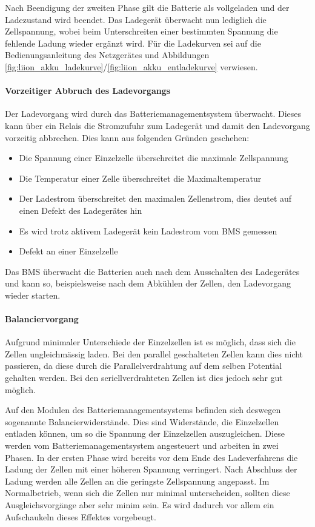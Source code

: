 Nach Beendigung der zweiten Phase gilt die Batterie als vollgeladen und der Ladezustand wird beendet. Das Ladegerät überwacht nun lediglich die Zellspannung, wobei beim Unterschreiten einer bestimmten Spannung die fehlende Ladung wieder ergänzt wird. Für die Ladekurven sei auf die Bedienungsanleitung des Netzgerätes \cite{ladegeraet} und Abbildungen \ref{fig:liion_akku_ladekurve}/\ref{fig:liion_akku_entladekurve} verwiesen.

\paragraph{Vorzeitiger Abbruch des Ladevorgangs}
Der Ladevorgang wird durch das Batteriemanagementsystem überwacht. Dieses kann über ein Relais die Stromzufuhr zum Ladegerät und damit den Ladevorgang vorzeitig abbrechen. Dies kann aus folgenden Gründen geschehen: \begin{itemize}
	\item Die Spannung einer Einzelzelle überschreitet die maximale Zellspannung
	\item Die Temperatur einer Zelle überschreitet die Maximaltemperatur
	\item Der Ladestrom überschreitet den maximalen Zellenstrom, dies deutet auf einen Defekt des Ladegerätes hin
	\item Es wird trotz aktivem Ladegerät kein Ladestrom vom BMS gemessen
	\item Defekt an einer Einzelzelle
\end{itemize}
Das BMS überwacht die Batterien auch nach dem Ausschalten des Ladegerätes und kann so, beispielsweise nach dem Abkühlen der Zellen, den Ladevorgang wieder starten.

\paragraph{Balanciervorgang}
Aufgrund minimaler Unterschiede der Einzelzellen ist es möglich, dass sich die Zellen ungleichmässig laden. Bei den parallel geschalteten Zellen kann dies nicht passieren, da diese durch die Parallelverdrahtung auf dem selben Potential gehalten werden. Bei den seriellverdrahteten Zellen ist dies jedoch sehr gut möglich.

Auf den Modulen des Batteriemanagementsystems befinden sich deswegen sogenannte Balancierwiderstände. Dies sind Widerstände, die Einzelzellen entladen können, um so die Spannung der Einzelzellen auszugleichen. Diese werden vom Batteriemanagementsystem angesteuert und arbeiten in zwei Phasen. In der ersten Phase wird bereits vor dem Ende des Ladeverfahrens die Ladung der Zellen mit einer höheren Spannung verringert. Nach Abschluss der Ladung werden alle Zellen an die geringste Zellspannung angepasst. Im Normalbetrieb, wenn sich die Zellen nur minimal unterscheiden, sollten diese Ausgleichsvorgänge aber sehr minim sein. Es wird dadurch vor allem ein Aufschaukeln dieses Effektes vorgebeugt.